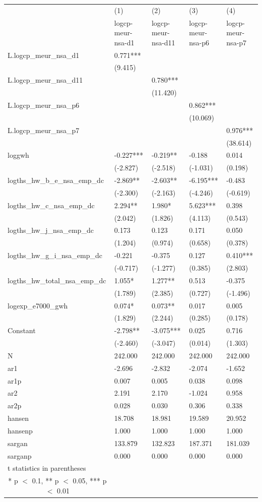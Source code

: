 \documentclass[12pt]{article}
\begin{document}
\begin{tabular}{ p{5.2cm} p{2cm} p{2cm} p{2cm} p{2cm} }

  \hline
   &(1)&(2)&(3)&(4)\\
   &\footnotesize{logcp-meur-nsa-d1}&\footnotesize{logcp-meur-nsa-d11}&\footnotesize{logcp-meur-nsa-p6}&\footnotesize{logcp-meur-nsa-p7}\\
 \hline
L.logcp\_meur\_nsa\_d1&0.771***& & & \\	
 &(9.415)& & & \\		
L.logcp\_meur\_nsa\_d11& &0.780***& & \\	
 & &(11.420)& & \\	
L.logcp\_meur\_nsa\_p6& & &0.862***& \\
 & & &(10.069)& \\
L.logcp\_meur\_nsa\_p7& & & &0.976***\\
 & & & &(38.614)\\
loggwh&-0.227***&-0.219**&-0.188&0.014\\
 &(-2.827)&(-2.518)&(-1.031)&(0.198)\\
logths\_hw\_b\_e\_nsa\_emp\_dc&-2.869**&-2.603**&-6.195***&-0.483\\
 &(-2.300)&(-2.163)&(-4.246)&(-0.619)\\
logths\_hw\_c\_nsa\_emp\_dc&2.294**&1.980*&5.623***&0.398\\
 &(2.042)&(1.826)&(4.113)&(0.543)\\
logths\_hw\_j\_nsa\_emp\_dc&0.173&0.123&0.171&0.050\\
 &(1.204)&(0.974)&(0.658)&(0.378)\\
logths\_hw\_g\_i\_nsa\_emp\_dc&-0.221&-0.375&0.127&0.410***\\
 &(-0.717)&(-1.277)&(0.385)&(2.803)\\
logths\_hw\_total\_nsa\_emp\_dc&1.055*&1.277**&0.513&-0.375\\
 &(1.789)&(2.385)&(0.727)&(-1.496)\\
logexp\_e7000\_gwh&0.074*&0.073**&0.017&0.005\\
 &(1.829)&(2.244)&(0.285)&(0.178)\\
Constant&-2.798**&-3.075***&0.025&0.716\\
 &(-2.460)&(-3.047)&(0.014)&(1.303)\\
 \hline
N&242.000&242.000&242.000&242.000\\
ar1&-2.696&-2.832&-2.074&-1.652\\
ar1p&0.007&0.005&0.038&0.098\\
ar2&2.191&2.170&-1.024&0.958\\
ar2p&0.028&0.030&0.306&0.338\\
hansen&18.708&18.981&19.589&20.952\\
hansenp&1.000&1.000&1.000&1.000\\
sargan&133.879&132.823&187.371&181.039\\
sarganp&0.000&0.000&0.000&0.000\\
 \hline
 t statistics in parentheses\\
\multicolumn{1}{c}{* p $<$ 0.1, ** p $<$ 0.05, *** p $<$ 0.01} \\

\end{tabular}
\end{document}
